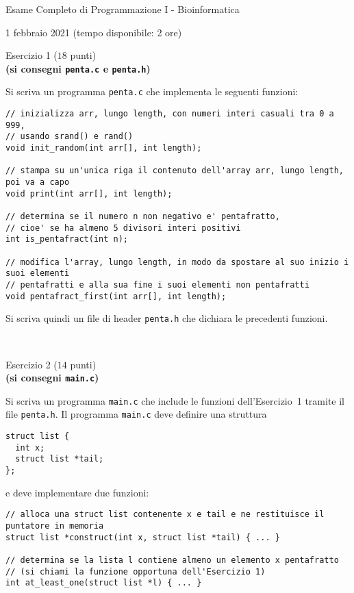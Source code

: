 \documentclass[12pt]{article}
\begin{document}
\begin{center}{\LARGE Esame Completo di Programmazione I - Bioinformatica}\\
\begin{center}
  \large 1 febbraio 2021 (tempo disponibile: 2 ore)
\end{center}
\end{center}

\vspace*{1ex}
\begin{center}{\Large Esercizio 1} ($18$ punti)\\
  \textbf{(si consegni \texttt{penta.c} e \texttt{penta.h})}
\end{center}
Si scriva un programma \texttt{penta.c} che implementa le seguenti funzioni:
\begin{verbatim}
// inizializza arr, lungo length, con numeri interi casuali tra 0 a 999,
// usando srand() e rand()
void init_random(int arr[], int length);

// stampa su un'unica riga il contenuto dell'array arr, lungo length, poi va a capo
void print(int arr[], int length);

// determina se il numero n non negativo e' pentafratto,
// cioe' se ha almeno 5 divisori interi positivi
int is_pentafract(int n);

// modifica l'array, lungo length, in modo da spostare al suo inizio i suoi elementi
// pentafratti e alla sua fine i suoi elementi non pentafratti
void pentafract_first(int arr[], int length);
\end{verbatim}
%
Si scriva quindi un file di header \texttt{penta.h} che dichiara le precedenti funzioni.

\mbox{}\\
\begin{center}{\Large Esercizio 2} ($14$ punti)\\
  \textbf{(si consegni \texttt{main.c})}\end{center}
%
Si scriva un programma \texttt{main.c} che include le funzioni dell'Esercizio~1 tramite
il file \texttt{penta.h}.
Il programma \texttt{main.c} deve definire una struttura

\begin{verbatim}
struct list {
  int x;
  struct list *tail;
};
\end{verbatim}

\noindent
e deve implementare due funzioni:

\begin{verbatim}
// alloca una struct list contenente x e tail e ne restituisce il puntatore in memoria
struct list *construct(int x, struct list *tail) { ... }

// determina se la lista l contiene almeno un elemento x pentafratto
// (si chiami la funzione opportuna dell'Esercizio 1)
int at_least_one(struct list *l) { ... }
\end{verbatim}
\end{document}
